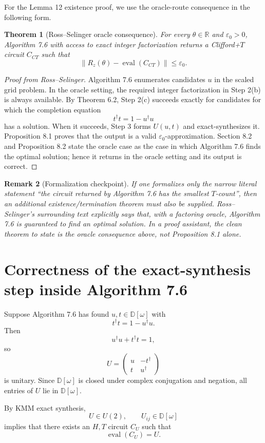 \documentclass[11pt]{article}
\newtheorem{theorem}{Theorem}[section]
\newtheorem{remark}[theorem]{Remark}
\newcommand{\R}{\mathbb R}
\newcommand{\Dw}{\mathbb D[\omega]}
\newcommand{\eps}{\varepsilon}
\newcommand{\opnorm}[1]{\left\|#1\right\|}
\newcommand{\mat}[1]{\begin{pmatrix}#1\end{pmatrix}}
\begin{document}
For the Lemma 12 existence proof, we use the oracle-route consequence in the following form.

\begin{theorem}[Ross--Selinger oracle consequence]
For every $\theta\in\R$ and $\eps_0>0$, Algorithm 7.6 with access to exact integer factorization returns a Clifford+$T$ circuit $C_{CT}$ such that
\[
  \opnorm{R_z(\theta)-\operatorname{eval}(C_{CT})}\le \eps_0.
\]
\end{theorem}

\begin{proof}[Proof from Ross--Selinger]
Algorithm 7.6 enumerates candidates $u$ in the scaled grid problem. In the oracle setting, the required integer factorization in Step 2(b) is always available. By Theorem 6.2, Step 2(c) succeeds exactly for candidates for which the completion equation
\[
  t^\dagger t=1-u^\dagger u
\]
has a solution. When it succeeds, Step 3 forms $U(u,t)$ and exact-synthesizes it. Proposition 8.1 proves that the output is a valid $\eps_0$-approximation. Section 8.2 and Proposition 8.2 state the oracle case as the case in which Algorithm 7.6 finds the optimal solution; hence it returns in the oracle setting and its output is correct.
\end{proof}

\begin{remark}[Formalization checkpoint]
If one formalizes only the narrow literal statement ``the circuit returned by Algorithm 7.6 has the smallest $T$-count'', then an additional existence/termination theorem must also be supplied. Ross--Selinger's surrounding text explicitly says that, with a factoring oracle, Algorithm 7.6 is guaranteed to find an optimal solution. In a proof assistant, the clean theorem to state is the oracle consequence above, not Proposition 8.1 alone.
\end{remark}

\section{Correctness of the exact-synthesis step inside Algorithm 7.6}

Suppose Algorithm 7.6 has found $u,t\in\Dw$ with
\[
  t^\dagger t=1-u^\dagger u.
\]
Then
\[
  u^\dagger u+t^\dagger t=1,
\]
so
\[
  U=\mat{u&-t^\dagger\\t&u^\dagger}
\]
is unitary. Since $\Dw$ is closed under complex conjugation and negation, all entries of $U$ lie in $\Dw$.

By KMM exact synthesis,
\[
  U\in U(2),\qquad U_{ij}\in\Dw
\]
implies that there exists an $H,T$ circuit $C_U$ such that
\[
  \operatorname{eval}(C_U)=U.
\]
\end{document}
